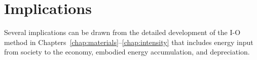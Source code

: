 %
%
%

\chapter{Implications}
\label{chap:implications}





Several implications can be drawn from the detailed development 
of the I-O method in Chapters~\ref{chap:materials}--\ref{chap:intensity}
that includes energy input from society to the economy,
embodied energy accumulation, and depreciation.


